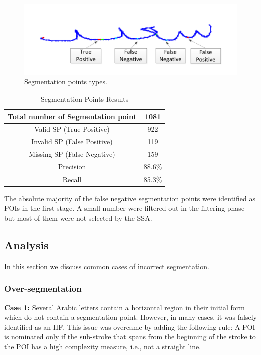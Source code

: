 \documentclass[10pt, conference, compsocconf]{IEEEtran}
\begin{document}
\begin{figure}
\centering
\includegraphics[width=0.9\columnwidth]{./figures/sp_types}
\caption{Segmentation points types.}
\label{fig:sp_types}
\end{figure}

\begin{table}[h]
\caption{Segmentation Points Results}
\begin{tabular}{ | c | c | }
  \hline
  Total number of Segmentation point & 1081 \\
  \hline
  Valid SP (True Positive) & 922 \\
  \hline
  Invalid SP (False Positive) & 119 \\
  \hline
  Missing SP (False Negative) & 159 \\
  \hline                                    
  Precision & 88.6\% \\ 
 \hline
  Recall &  85.3\% \\ 
 \hline
\end{tabular}
\centering
\label{table:sp_results} 
\end{table}

The absolute majority of the false negative segmentation points were identified as POIs in the first stage. A small number were filtered out in the filtering phase but most of them were not selected by the SSA.

\subsection{Analysis}
In this section we discuss common cases of incorrect segmentation.
\subsubsection{Over-segmentation}
\textbf{Case 1:} Several Arabic letters contain a horizontal region in their initial form which do not contain a segmentation point. However, in many cases, it was falsely identified as an HF. This issue was overcame by adding the following rule: A POI is nominated only if the sub-stroke that spans from the beginning of the stroke to the POI has a high complexity measure, i.e., not a straight line.\\
\end{document}
